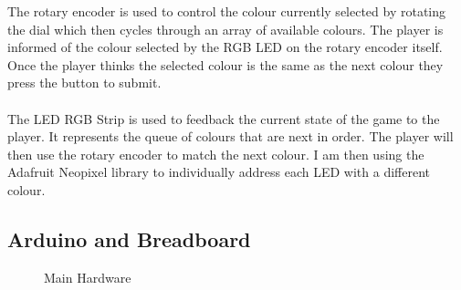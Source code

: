 \documentclass{article}
\begin{document}
The rotary encoder is used to control the colour currently selected by rotating the dial which then cycles through an array of available colours. The player is informed of the colour selected by the RGB LED on the rotary encoder itself. Once the player thinks the selected colour is the same as the next colour they press the button to submit.
\\
\\
The LED RGB Strip is used to feedback the current state of the game to the player. It represents the queue of colours that are next in order. The player will then use the rotary encoder to match the next colour. I am then using the Adafruit Neopixel library to individually address each LED with a different colour.

\subsection{Arduino and Breadboard}

\begin{figure}[ht]%
    \centering
    \qquad
    \caption{Main Hardware}%
    \label{fig:main_hardware}%
\end{figure}
\end{document}
